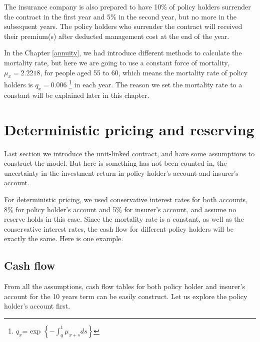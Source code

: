 \documentclass{report}
\begin{document}
The insurance company is also prepared to have 10\% of policy holders surrender the contract in the first year and 5\% in the second year, but no more in the subsequent years. The policy holders who surrender the contract will received their premium(s) after deducted management cost at the end of the year.

In the Chapter \ref{annuity}, we had introduce different methods to calculate the mortality rate, but here we are going to use a constant force of mortality, $\mu_x=2.2218$, for people aged 55 to 60, which means the mortality rate of policy holders is $q_x=0.006$ \footnote{$q_x$= exp $\left\{-\int_0^1 \mu_{x+s}ds\right\}$} in each year. The reason we set the mortality rate to a constant will be explained later in this chapter.  





\section{Deterministic pricing and reserving}

Last section we introduce the unit-linked contract, and have some assumptions to construct the model. But here is something has not been counted in, the uncertainty in the investment return in policy holder's account and insurer's account. 

For deterministic pricing, we used conservative interest rates for both accounts, 8\% for policy holder's account and 5\% for insurer's account, and assume no reserve holds in this case. Since the mortality rate is a constant, as well as the conservative interest rates, the cash flow for different policy holders will be exactly the same. Here is one example.

\subsection{Cash flow}

From all the assumptions, cash flow tables for both policy holder and insurer's account for the  10 years term can be easily construct. Let us explore the policy holder's account first. 
\end{document}
